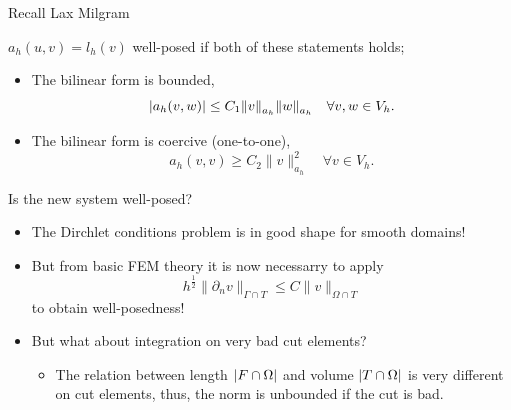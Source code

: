 \begin{frame}{ Recall Lax Milgram }

    \begin{theorem}[ ]

        $a_{h}( u,v) = l_{h}( v)  $ well-posed if both of these statements holds;
        \begin{itemize}
            \item The bilinear form is bounded,
                \[
                      \left\lvert a_{h}( v,w)   \right\rvert    \le C_{1} \| v \|_{a_{h}  }^{  }  \| w \|_{a_{h}  }^{  } \quad \forall v,w  \in V_{h}.
                \]
            \item The bilinear form is coercive (one-to-one), \[
           a_{h}( v,v) \ge  C_{2} \| v \|_{ a_{h} }^{  2} \quad \forall v \in V_{h}.
            \]
        \end{itemize}
    \end{theorem}
\end{frame}

\begin{frame}{Is the new system well-posed?  }

    \begin{itemize}
        \item The Dirchlet conditions problem is in good shape for smooth domains!
        \item But from basic FEM theory it is now necessarry to apply  \[
h^{\frac{1}{2}} \| \partial _{n} v \|_{ \Gamma \cap T  }^{  } \le C \| v  \|_{ \Omega \cap T      }^{  }
        \]
        to obtain well-posedness!
        \item But what about integration on very bad cut elements?
            \begin{itemize}
                \item The relation between length $  \left\lvert F\cap \Omega   \right\rvert $ and volume $ \left\lvert T\cap \Omega   \right\rvert $ is very different on cut elements, thus, the norm is unbounded if the cut is bad.
            \end{itemize}
    \end{itemize}

\end{frame}


